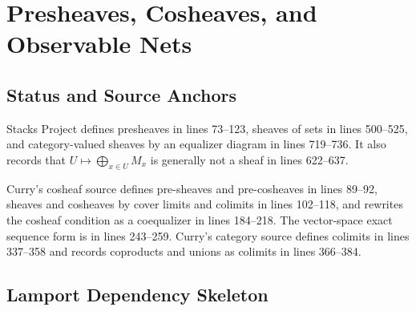
\section{Presheaves, Cosheaves, and Observable Nets}
\label{sec:presheaves-cosheaves-observable-nets}

\subsection{Status and Source Anchors}

Stacks Project
 defines
presheaves in lines 73--123, sheaves of sets in lines 500--525, and
category-valued sheaves by an equalizer diagram in lines 719--736.  It also
records that \(U\mapsto\bigoplus_{x\in U}M_x\) is generally not a sheaf in
lines 622--637.

Curry's cosheaf source
defines pre-sheaves and pre-cosheaves in lines 89--92, sheaves and cosheaves
by cover limits and colimits in lines 102--118, and rewrites the cosheaf
condition as a coequalizer in lines 184--218.  The vector-space exact sequence
form is in lines 243--259.  Curry's category source
 defines
colimits in lines 337--358 and records coproducts and unions as colimits in
lines 366--384.

\subsection{Lamport Dependency Skeleton}

